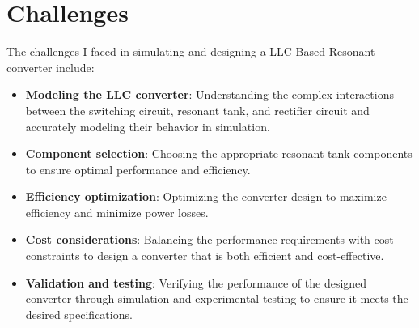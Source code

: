 \section{Challenges}
The challenges I faced in simulating and designing a LLC Based Resonant converter include:
\begin{itemize}
    \item \textbf{Modeling the LLC converter}: Understanding the complex interactions between the switching circuit, resonant tank, and rectifier circuit and accurately modeling their behavior in simulation.
    \item \textbf{Component selection}: Choosing the appropriate resonant tank components to ensure optimal performance and efficiency.
    \item \textbf{Efficiency optimization}: Optimizing the converter design to maximize efficiency and minimize power losses.
    \item \textbf{Cost considerations}: Balancing the performance requirements with cost constraints to design a converter that is both efficient and cost-effective.
    \item \textbf{Validation and testing}: Verifying the performance of the designed converter through simulation and experimental testing to ensure it meets the desired specifications.
\end{itemize}